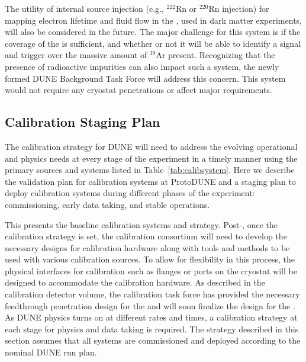The utility of internal source injection (e.g., ${}^{222}$Rn or ${}^{220}$Rn injection) for mapping electron lifetime and fluid flow in the , used in dark matter experiments, will also be considered in the future. The major challenge for this system is if the 
coverage of the  is sufficient, and whether or not it will be able to identify a signal and trigger over the massive amount of ${}^{39}$Ar present. Recognizing that the presence of radioactive impurities can also impact such a system, the newly formed DUNE  Background Task Force will address this concern. This system would not require any cryostat penetrations or affect major  requirements.







\subsection{Calibration Staging Plan}
\label{sec:phys-calib-approach}


The calibration strategy for DUNE will need to address the evolving operational and physics needs at every stage of the experiment in a timely manner using the primary sources and systems listed in Table~\ref{tab:calibsystem}. 
Here we describe the validation plan for calibration systems at ProtoDUNE and a staging plan to deploy calibration systems during different phases of the experiment: commissioning, early data taking, and stable operations. 

This  presents the baseline calibration systems and strategy. Post-, once the calibration strategy is set, the calibration consortium will need to develop the necessary designs for calibration hardware along with tools and methods to be used with various calibration sources. To allow for flexibility in this process, the physical interfaces for calibration such as flanges or ports on the cryostat will be designed to accommodate the calibration hardware. As described in the calibration  detector volume, the calibration task force has provided the necessary feedthrough penetration design 
for the  and will soon finalize the design for the .  As DUNE physics turns on at different rates and times, a calibration strategy at each stage for physics and data taking is required. The strategy described in this section assumes that all systems are commissioned and deployed according to the nominal DUNE run plan.

